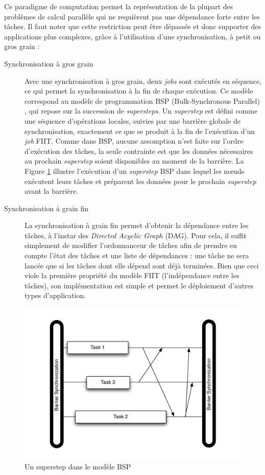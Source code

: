 Ce paradigme de computation permet la représentation de la plupart des problèmes de calcul parallèle qui ne requièrent pas une dépendance forte entre les tâches. Il faut noter que cette restriction peut être dépassée et donc supporter des applications plus complexes, grâce à l'utilisation d'une synchronisation, à petit ou gros grain :

\begin{description}
\item [Synchronisation à gros grain] Avec une synchronisation à gros grain, deux \textit{jobs} sont exécutés en séquence, ce qui permet la synchronisation à la fin de chaque exécution. Ce modèle correspond au modèle de programmation BSP (Bulk-Synchronous Parallel) \cite{Valiant90}, qui repose sur la succession de \textit{supersteps}. Un \textit{superstep} est défini comme une séquence d'opérations locales, suivies par une barrière globale de synchronisation, exactement ce que se produit à la fin de l'exécution d'un \textit{job} FIIT. Comme dans BSP, aucune assomption n'est faite sur l'ordre d'exécution des tâches, la seule contrainte est que les données nécessaires au prochain \textit{superstep} soient disponibles au moment de la barrière. La Figure \ref{fig:Superstep}  illustre l'exécution d'un \textit{superstep} BSP dans lequel les n{\oe}uds exécutent leurs tâches et préparent les données pour le prochain \textit{superstep} avant la barrière.

\item [Synchronisation à grain fin] La synchronisation à grain fin permet d'obtenir la dépendance entre les tâches, à l'instar des \textit{Directed Acyclic Graph} (DAG). Pour cela, il suffit simplement de modifier l'ordonnanceur de tâches afin de prendre en compte l'état des tâches et une liste de dépendances : une tâche ne sera lancée que si les tâches dont elle dépend sont déjà terminées. Bien que ceci viole la première propriété du modèle FIIT (l'indépendance entre les tâches), son implémentation est simple et permet le déploiement d'autres types d'application.
\end{description}


\begin{figure}
	\centering
		\includegraphics[width=0.5\linewidth]{img/BSP}
		\caption{Un superstep dans le modèle BSP}\label{fig:Superstep}
\end{figure}

